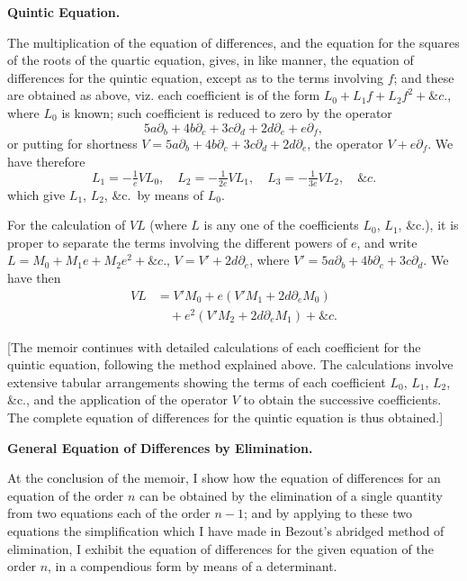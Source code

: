 \documentclass[11pt,a4paper]{book}
\begin{document}
\newpage
\noindent\textbf{Quintic Equation.}

The  multiplication  of  the  equation  of  differences,  and  the  equation  for  the  squares
of  the  roots  of  the  quartic  equation,  gives,  in  like  manner,  the  equation  of  differences
for  the  quintic  equation,  except  as  to  the  terms  involving  $f$;  and  these  are  obtained
as  above,  viz.  each  coefficient  is  of  the  form  $L_0 + L_1 f + L_2 f^2 + \&c.$,  where  $L_0$  is  known;
such  coefficient  is  reduced  to  zero  by  the  operator
\[
5a\partial_b + 4b\partial_c + 3c\partial_d + 2d\partial_e + e\partial_f,
\]
or  putting  for  shortness  $V = 5a\partial_b + 4b\partial_c + 3c\partial_d + 2d\partial_e$,  the  operator  $V + e\partial_f$.  We  have
therefore
\[
L_1 = -\tfrac{1}{e} VL_0, \quad L_2 = -\tfrac{1}{2e} VL_1, \quad L_3 = -\tfrac{1}{3e} VL_2, \quad \&c.
\]
which  give  $L_1$,  $L_2$,  \&c.\  by  means  of  $L_0$.

For  the  calculation  of  $VL$  (where  $L$  is  any  one  of  the  coefficients  $L_0$,  $L_1$,  \&c.),
it  is  proper  to  separate  the  terms  involving  the  different  powers  of  $e$,  and  write
$L = M_0 + M_1 e + M_2 e^2 + \&c.$,  $V = V' + 2d\partial_e$,  where  $V' = 5a\partial_b + 4b\partial_c + 3c\partial_d$.  We  have  then
\begin{align*}
VL &= V'M_0 + e(V'M_1 + 2d\partial_e M_0) \\
   &\quad + e^2(V'M_2 + 2d\partial_e M_1) + \&c.
\end{align*}

\medskip

[The  memoir  continues  with  detailed  calculations  of  each  coefficient  for  the  quintic
equation,  following  the  method  explained  above.  The  calculations  involve  extensive
tabular  arrangements  showing  the  terms  of  each  coefficient  $L_0$,  $L_1$,  $L_2$,  \&c.,  and
the  application  of  the  operator  $V$  to  obtain  the  successive  coefficients.  The  complete
equation  of  differences  for  the  quintic  equation  is  thus  obtained.]

\medskip

\noindent\textbf{General  Equation  of  Differences  by  Elimination.}

At  the  conclusion  of  the  memoir,  I  show  how  the  equation  of  differences  for  an
equation  of  the  order  $n$  can  be  obtained  by  the  elimination  of  a  single  quantity  from
two  equations  each  of  the  order  $n-1$;  and  by  applying  to  these  two  equations  the
simplification  which  I  have  made  in  Bezout's  abridged  method  of  elimination,  I  exhibit
the  equation  of  differences  for  the  given  equation  of  the  order  $n$,  in  a  compendious
form  by  means  of  a  determinant.
\end{document}
